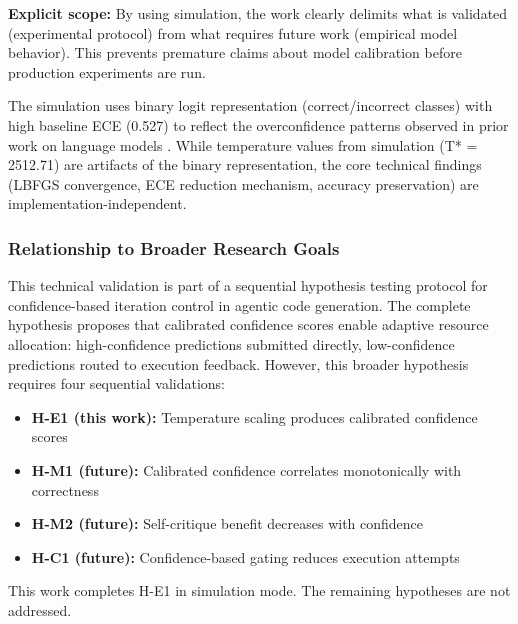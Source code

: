 \textbf{Explicit scope:} By using simulation, the work clearly delimits what is validated (experimental protocol) from what requires future work (empirical model behavior). This prevents premature claims about model calibration before production experiments are run.

The simulation uses binary logit representation (correct/incorrect classes) with high baseline ECE (0.527) to reflect the overconfidence patterns observed in prior work on language models \citep{kadavath2022language}. While temperature values from simulation (T* = 2512.71) are artifacts of the binary representation, the core technical findings (LBFGS convergence, ECE reduction mechanism, accuracy preservation) are implementation-independent.

\subsubsection{Relationship to Broader Research Goals}

This technical validation is part of a sequential hypothesis testing protocol for confidence-based iteration control in agentic code generation. The complete hypothesis proposes that calibrated confidence scores enable adaptive resource allocation: high-confidence predictions submitted directly, low-confidence predictions routed to execution feedback. However, this broader hypothesis requires four sequential validations:

\begin{itemize}
\item \textbf{H-E1 (this work):} Temperature scaling produces calibrated confidence scores
\item \textbf{H-M1 (future):} Calibrated confidence correlates monotonically with correctness
\item \textbf{H-M2 (future):} Self-critique benefit decreases with confidence
\item \textbf{H-C1 (future):} Confidence-based gating reduces execution attempts
\end{itemize}

This work completes H-E1 in simulation mode. The remaining hypotheses are not addressed.
